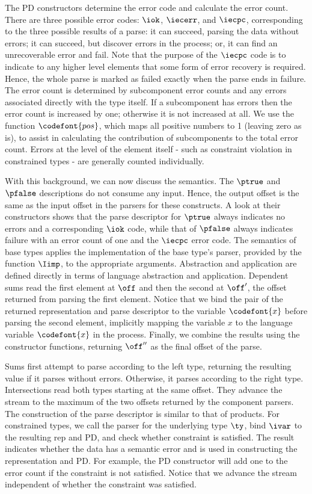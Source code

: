 The PD constructors determine the error code and calculate the error
count.  There are three possible error codes: $\iok$, $\iecerr$, and
$\iecpc$, corresponding to the three possible results of a parse: it
can succeed, parsing the data without errors; it can succeed, but
discover errors in the process; or, it can find an unrecoverable error
and fail.  Note that the purpose of the $\iecpc$ code is to
indicate to any higher level elements that some form of error recovery
is required.  Hence, the whole parse is marked as failed exactly when
the parse ends in failure.  The error count is determined by
subcomponent error counts and any errors associated directly with the
type itself.  If a subcomponent has errors then the error count is
increased by one; otherwise it is not increased at all. We use the
function $\codefont {pos}$, which maps all positive numbers to 1
(leaving zero as is), to assist in calculating the contribution of
subcomponents to the total error count.  Errors at the level of the
element itself - such as constraint violation in constrained types -
are generally counted individually.

With this background, we can now discuss the semantics.  The $\ptrue$ and
$\pfalse$ descriptions do not consume any input. Hence, the output offset is the
same as the input offset in the parsers for these constructs. A look
at their constructors shows that the parse descriptor for $\ptrue$
always indicates no errors and a corresponding $\iok$ code, while that
of $\pfalse$ always indicates failure with an error count of one and
the $\iecpc$ error code. The semantics of base types applies the
implementation of the base type's parser, provided by the function
$\Iimp$, to the appropriate arguments.  Abstraction and application
are defined directly in terms of \implang language abstraction and
application.  Dependent sums read the first element at $\off$ and then
the second at $\off'$, the offset returned from parsing the first
element.  Notice that we bind the pair of the returned representation
and parse descriptor to the variable $\codefont{x}$ before parsing the
second element, implicitly mapping the \ddc{} variable $x$ to the
\implang{} language variable $\codefont{x}$ in the process.  Finally,
we combine the results using the constructor functions, returning
$\off''$ as the final offset of the parse.

Sums first attempt to parse according to the left type, returning the resulting
value if it parses without errors. Otherwise, it parses according to
the right type. Intersections read both types starting at the same
offset. They advance the stream to the maximum of the two offsets
returned by the component parsers. The construction of the parse
descriptor is similar to that of products. For constrained types, we call the
parser for the underlying type $\ty$, bind $\ivar$ to the resulting rep
and PD, and check whether constraint is satisfied. The result
indicates whether the data has a semantic error and is used in
constructing the representation and PD. For example, the PD constructor will add
one to the error count if the constraint is not satisfied. Notice that
we advance the stream independent of whether the constraint was
satisfied.

